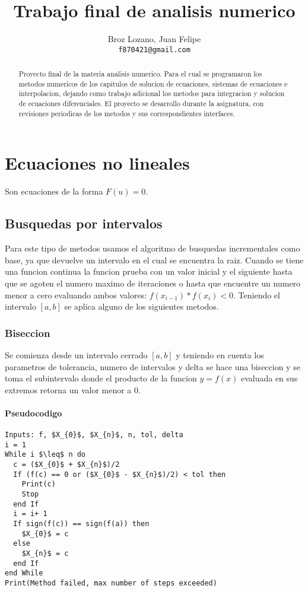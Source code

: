 \documentclass[11pt]{article}
\author{
  Broz Lozano, Juan Felipe\\
  \texttt{f870421@gmail.com}
}
\title{Trabajo final de analisis numerico}
\begin{document}
\maketitle

\begin{abstract}
  Proyecto final de la materia analisis numerico. Para el cual se programaron los metodos numericos de los capitulos de solucion de ecuaciones, sistemas de ecuaciones e interpolacion, dejando como trabajo adicional los metodos para integracion y solucion de ecuaciones diferenciales. El proyecto se desarrollo durante la asignatura, con revisiones periodicas de los metodos y sus correspondientes interfaces.
\end{abstract}


\newpage
\section{Ecuaciones no lineales}
Son ecuaciones de la forma $F(u) = 0$. 

\subsection{Busquedas por intervalos}
Para este tipo de metodos usamos el algoritmo de busquedas incrementales como base, ya que devuelve un intervalo en el cual se encuentra la raiz. Cuando se tiene una funcion continua la funcion prueba con un valor inicial y el siguiente hasta que se agoten el numero maximo de iteraciones o hasta que encuentre un numero menor a cero evaluando ambos valores: $f(x_{i-1}) * f(x_{i}) < 0$.
Teniendo el intervalo $[a,b]$ se aplica alguno de los siguientes metodos.

\subsubsection{Biseccion}
Se comienza desde un intervalo cerrado $[a,b]$ y teniendo en cuenta los parametros de tolerancia, numero de intervalos y delta se hace una biseccion y se toma el subintervalo donde el producto de la funcion $y = f(x)$ evaluada en sus extremos retorna un valor menor a 0.
\paragraph{Pseudocodigo\\}
\begin{lstlisting}[frame=single, mathescape=true]
Inputs: f, $X_{0}$, $X_{n}$, n, tol, delta
i = 1
While i $\leq$ n do         
  c = ($X_{0}$ + $X_{n}$)/2      
  If (f(c) == 0 or ($X_{0}$ - $X_{n}$)/2) < tol then 
    Print(c)
    Stop
  end If
  i = i+ 1                                                         
  If sign(f(c)) == sign(f(a)) then 
    $X_{0}$ = c 
  else
    $X_{n}$ = c
  end If
end While
Print(Method failed, max number of steps exceeded)
\end{lstlisting}
\end{document}
